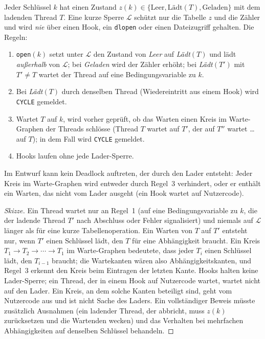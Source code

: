 Jeder Schlüssel $k$ hat einen Zustand $z(k)\in\{\mathrm{Leer},\text{Lädt}(T),\mathrm{Geladen}\}$ mit dem ladenden Thread $T$. Eine kurze Sperre $\mathcal{L}$ schützt nur die Tabelle $z$ und die Zähler und wird \emph{nie} über einen Hook, ein \texttt{dlopen} oder einen Dateizugriff gehalten. Die Regeln:
\begin{enumerate}
	\item \texttt{open}$(k)$ setzt unter $\mathcal{L}$ den Zustand von \emph{Leer} auf \emph{Lädt}$(T)$ und lädt \emph{außerhalb} von $\mathcal{L}$; bei \emph{Geladen} wird der Zähler erhöht; bei \emph{Lädt}$(T')$ mit $T'\ne T$ wartet der Thread auf eine Bedingungsvariable zu $k$.
	\item Bei \emph{Lädt}$(T)$ durch denselben Thread (Wiedereintritt aus einem Hook) wird \texttt{CYCLE} gemeldet.
	\item Wartet $T$ auf $k$, wird vorher geprüft, ob das Warten einen Kreis im Warte-Graphen der Threads schlösse (Thread $T$ wartet auf $T'$, der auf $T''$ wartet \ldots auf $T$); in dem Fall wird \texttt{CYCLE} gemeldet.
	\item Hooks laufen ohne jede Lader-Sperre.
\end{enumerate}

\begin{satz}
	\label{satz:skizze-deadlock}
	Im Entwurf kann kein Deadlock auftreten, der durch den Lader entsteht: Jeder Kreis im Warte-Graphen wird entweder durch Regel~3 verhindert, oder er enthält ein Warten, das nicht vom Lader ausgeht (ein Hook wartet auf Nutzercode).
\end{satz}

\begin{proof}[Skizze]
	Ein Thread wartet nur an Regel~1 (auf eine Bedingungsvariable zu $k$, die der ladende Thread $T'$ nach Abschluss oder Fehler signalisiert) und niemals auf $\mathcal{L}$ länger als für eine kurze Tabellenoperation. Ein Warten von $T$ auf $T'$ entsteht nur, wenn $T'$ einen Schlüssel lädt, den $T$ für eine Abhängigkeit braucht. Ein Kreis $T_1\to T_2\to\cdots\to T_1$ im Warte-Graphen bedeutete, dass jeder $T_i$ einen Schlüssel lädt, den $T_{i-1}$ braucht; die Wartekanten wären also Abhängigkeitskanten, und Regel~3 erkennt den Kreis beim Eintragen der letzten Kante. Hooks halten keine Lader-Sperre; ein Thread, der in einem Hook auf Nutzercode wartet, wartet nicht auf den Lader. Ein Kreis, an dem solche Kanten beteiligt sind, geht vom Nutzercode aus und ist nicht Sache des Laders. Ein vollständiger Beweis müsste zusätzlich Ausnahmen (ein ladender Thread, der abbricht, muss $z(k)$ zurücksetzen und die Wartenden wecken) und das Verhalten bei mehrfachen Abhängigkeiten auf denselben Schlüssel behandeln.
\end{proof}


